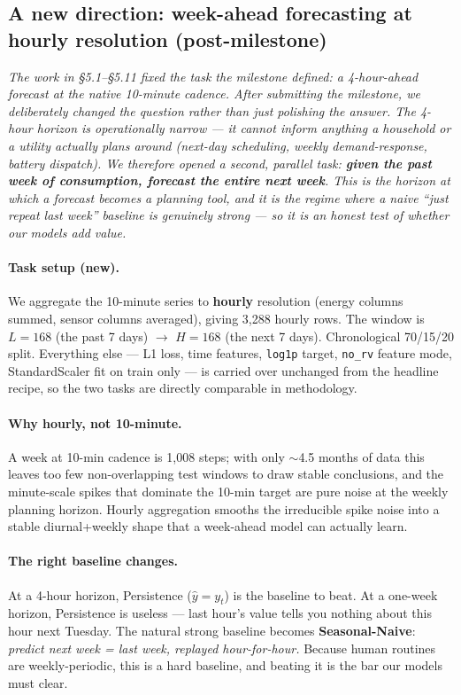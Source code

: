 \documentclass[11pt,letterpaper]{article}
\begin{document}
\subsection{A new direction: week-ahead forecasting at hourly resolution (post-milestone)}
\label{sec:weekly}

\textit{The work in \S5.1--\S5.11 fixed the task the milestone defined: a
4-hour-ahead forecast at the native 10-minute cadence. After submitting
the milestone, we deliberately changed the question rather than just
polishing the answer. The 4-hour horizon is operationally narrow --- it
cannot inform anything a household or a utility actually plans around
(next-day scheduling, weekly demand-response, battery dispatch). We
therefore opened a second, parallel task: \textbf{given the past week of
consumption, forecast the entire next week}. This is the horizon at which
a forecast becomes a planning tool, and it is the regime where a naive
``just repeat last week'' baseline is genuinely strong --- so it is an
honest test of whether our models add value.}

\paragraph{Task setup (new).} We aggregate the 10-minute series to
\textbf{hourly} resolution (energy columns summed, sensor columns
averaged), giving 3{,}288 hourly rows. The window is $L=168$ (the past 7
days) $\rightarrow$ $H=168$ (the next 7 days). Chronological 70/15/20
split. Everything else --- L1 loss, time features, \texttt{log1p} target,
\texttt{no\_rv} feature mode, StandardScaler fit on train only --- is
carried over unchanged from the headline recipe, so the two tasks are
directly comparable in methodology.

\paragraph{Why hourly, not 10-minute.} A week at 10-min cadence is 1{,}008
steps; with only $\sim$4.5 months of data this leaves too few
non-overlapping test windows to draw stable conclusions, and the
minute-scale spikes that dominate the 10-min target are pure noise at the
weekly planning horizon. Hourly aggregation smooths the irreducible spike
noise into a stable diurnal+weekly shape that a week-ahead model can
actually learn.

\paragraph{The right baseline changes.} At a 4-hour horizon, Persistence
($\hat{y} = y_t$) is the baseline to beat. At a one-week horizon,
Persistence is useless --- last hour's value tells you nothing about this
hour next Tuesday. The natural strong baseline becomes
\textbf{Seasonal-Naive}: \emph{predict next week = last week, replayed
hour-for-hour.} Because human routines are weekly-periodic, this is a
hard baseline, and beating it is the bar our models must clear.
\end{document}
